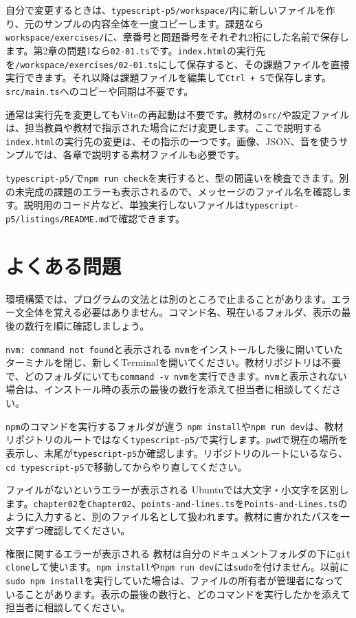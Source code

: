 自分で変更するときは、\texttt{typescript-p5/workspace/}内に新しいファイルを作り、元のサンプルの内容全体を一度コピーします。課題なら\texttt{workspace/exercises/}に、章番号と問題番号をそれぞれ2桁にした名前で保存します。第2章の問題1なら\texttt{02-01.ts}です。\texttt{index.html}の実行先を\texttt{/workspace/exercises/02-01.ts}にして保存すると、その課題ファイルを直接実行できます。それ以降は課題ファイルを編集して\texttt{Ctrl + S}で保存します。\texttt{src/main.ts}へのコピーや同期は不要です。

通常は実行先を変更してもViteの再起動は不要です。教材の\texttt{src/}や設定ファイルは、担当教員や教材で指示された場合にだけ変更します。ここで説明する\texttt{index.html}の実行先の変更は、その指示の一つです。画像、JSON、音を使うサンプルでは、各章で説明する素材ファイルも必要です。

\texttt{typescript-p5/}で\texttt{npm run check}を実行すると、型の間違いを検査できます。別の未完成の課題のエラーも表示されるので、メッセージのファイル名を確認します。説明用のコード片など、単独実行しないファイルは\texttt{typescript-p5/listings/README.md}で確認できます。

\section{よくある問題}

環境構築では、プログラムの文法とは別のところで止まることがあります。エラー文全体を覚える必要はありません。コマンド名、現在いるフォルダ、表示の最後の数行を順に確認しましょう。

\begin{mistakebox}{\texttt{nvm: command not found}と表示される}
\texttt{nvm}をインストールした後に開いていたターミナルを閉じ、新しくTerminalを開いてください。教材リポジトリは不要で、どのフォルダにいても\texttt{command -v nvm}を実行できます。\texttt{nvm}と表示されない場合は、インストール時の表示の最後の数行を添えて担当者に相談してください。
\end{mistakebox}

\begin{mistakebox}{\texttt{npm}のコマンドを実行するフォルダが違う}
\texttt{npm install}や\texttt{npm run dev}は、教材リポジトリのルートではなく\texttt{typescript-p5/}で実行します。\texttt{pwd}で現在の場所を表示し、末尾が\texttt{typescript-p5}か確認します。リポジトリのルートにいるなら、\texttt{cd typescript-p5}で移動してからやり直してください。
\end{mistakebox}

\begin{mistakebox}{ファイルがないというエラーが表示される}
Ubuntuでは大文字・小文字を区別します。\texttt{chapter02}を\texttt{Chapter02}、\texttt{points-and-lines.ts}を\texttt{Points-and-Lines.ts}のように入力すると、別のファイル名として扱われます。教材に書かれたパスを一文字ずつ確認してください。
\end{mistakebox}

\begin{mistakebox}{権限に関するエラーが表示される}
教材は自分のドキュメントフォルダの下に\texttt{git clone}して使います。\texttt{npm install}や\texttt{npm run dev}には\texttt{sudo}を付けません。以前に\texttt{sudo npm install}を実行していた場合は、ファイルの所有者が管理者になっていることがあります。表示の最後の数行と、どのコマンドを実行したかを添えて担当者に相談してください。
\end{mistakebox}

